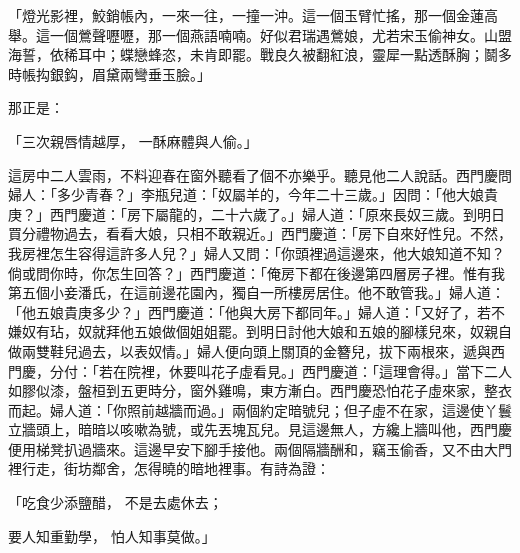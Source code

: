 \begin{showcontents}{}
「燈光影裡，鮫銷帳內，一來一往，一撞一沖。這一個玉臂忙搖，那一個金蓮高舉。這一個鶯聲嚦嚦，那一個燕語喃喃。好似君瑞遇鶯娘，尤若宋玉偷神女。山盟海誓，依稀耳中；蝶戀蜂恣，未肯即罷。戰良久被翻紅浪，靈犀一點透酥胸；鬬多時帳抅銀鈎，眉黛兩彎垂玉臉。」

那正是：

「三次親唇情越厚，  一酥麻體與人偷。」

這房中二人雲雨，不料迎春在窗外聽看了個不亦樂乎。聽見他二人說話。西門慶問婦人：「多少青春？」李瓶兒道：「奴屬羊的，今年二十三歲。」因問：「他大娘貴庚？」西門慶道：「房下屬龍的，二十六歲了。」婦人道：「原來長奴三歲。到明日買分禮物過去，看看大娘，只相不敢親近。」西門慶道：「房下自來好性兒。不然，我房裡怎生容得這許多人兒？」婦人又問：「你頭裡過這邊來，他大娘知道不知？倘或問你時，你怎生回答？」西門慶道：「俺房下都在後邊第四層房子裡。惟有我第五個小妾潘氏，在這前邊花園內，獨自一所樓房居住。他不敢管我。」婦人道：「他五娘貴庚多少？」西門慶道：「他與大房下都同年。」婦人道：「又好了，若不嫌奴有玷，奴就拜他五娘做個姐姐罷。到明日討他大娘和五娘的腳樣兒來，奴親自做兩雙鞋兒過去，以表奴情。」婦人便向頭上關頂的金簪兒，拔下兩根來，遞與西門慶，分付：「若在院裡，休要叫花子虛看見。」西門慶道：「這理會得。」當下二人如膠似漆，盤桓到五更時分，窗外雞鳴，東方漸白。西門慶恐怕花子虛來家，整衣而起。婦人道：「你照前越牆而過。」兩個約定暗號兒；但子虛不在家，這邊使丫鬟立牆頭上，暗暗以咳嗽為號，或先丟塊瓦兒。見這邊無人，方纔上牆叫他，西門慶便用梯凳扒過牆來。這邊早安下腳手接他。兩個隔牆酬和，竊玉偷香，又不由大門裡行走，街坊鄰舍，怎得曉的暗地裡事。有詩為證：

「吃食少添鹽醋，  不是去處休去；

要人知重勤學，  怕人知事莫做。」


\end{showcontents}
